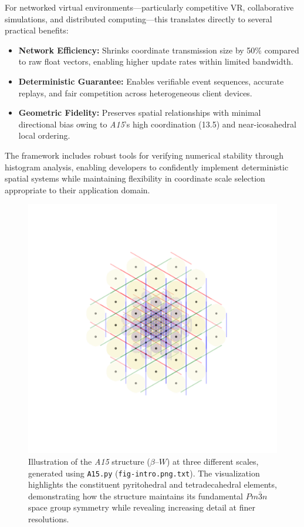\documentclass[10pt]{article}
\def\AAAB{\textit{A15}}
\def\betaW{$\beta$--$W$}
\begin{document}
For networked virtual environments—particularly competitive VR, collaborative simulations, and distributed computing—this translates directly to several practical benefits:
\begin{itemize}
    \item \textbf{Network Efficiency:} Shrinks coordinate transmission size by 50\% compared to raw float vectors, enabling higher update rates within limited bandwidth.
    \item \textbf{Deterministic Guarantee:} Enables verifiable event sequences, accurate replays, and fair competition across heterogeneous client devices.
    \item \textbf{Geometric Fidelity:} Preserves spatial relationships with minimal directional bias owing to \AAAB{}'s high coordination (13.5) and near-icosahedral local ordering.
\end{itemize}
The framework includes robust tools for verifying numerical stability through histogram analysis, enabling developers to confidently implement deterministic spatial systems while maintaining flexibility in coordinate scale selection appropriate to their application domain.

\begin{figure}[!ht]
    \capstart
    \centering
    \includegraphics[trim={150 150 150 155}, scale=0.75]{fig-intro}
    \caption{Illustration of the \AAAB{} structure (\betaW{}) at three different scales, generated using \texttt{A15.py} (\texttt{fig-intro.png.txt}). The visualization highlights the constituent pyritohedral and tetradecahedral elements, demonstrating how the structure maintains its fundamental $Pm\bar{3}n$ space group symmetry while revealing increasing detail at finer resolutions.}
    \label{fig-intro}
\end{figure}
\end{document}
